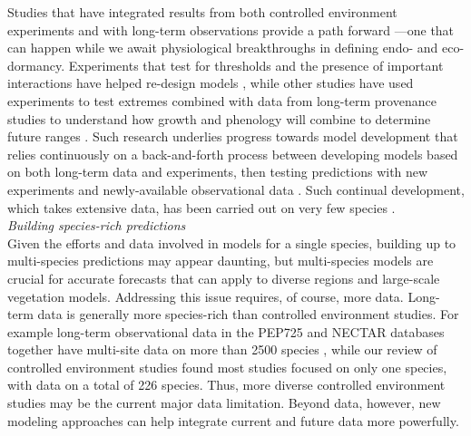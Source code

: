 \documentclass[11pt,letter]{article}
\begin{document}
Studies that have integrated results from both controlled environment experiments and with long-term observations provide a path forward \citep{Caffarra:2011qf,nagano2012,satake2013,ford2016,chuinearees}---one that can happen while we await physiological breakthroughs in defining endo- and eco-dormancy. Experiments that test for thresholds and the presence of important interactions have helped re-design models \citep{Caffarra:2011qf,chuinearees}, while other studies have used experiments to test extremes combined with data from long-term provenance studies to understand how growth and phenology will combine to determine future ranges \citep{ford2016}. Such research underlies progress towards model development that relies continuously on a back-and-forth process between developing models based on both long-term data and experiments, then testing predictions with new experiments and newly-available observational data \citep[i.e., more years and also data from new locations,][]{nagano2012,satake2013}. Such continual development, which takes extensive data, has been carried out on very few species \citep[e.g., \emph{Arabidopsis thaliana}, \emph{Oryza sativa} (rice), \emph{Arabidopsis halleri},][]{Wilczek:2009oa,nagano2012,satake2013}.\\

\emph{Building species-rich predictions}\\
Given the efforts and data involved in models for a single species, building up to multi-species predictions may appear daunting, but multi-species models are crucial for accurate forecasts that can apply to diverse regions and large-scale vegetation models. Addressing this issue requires, of course, more data. Long-term data is generally more species-rich than controlled environment studies. For example long-term observational data in the PEP725 and NECTAR databases together have multi-site data on more than 2500 species \citep{nectar,Templ2018}, while our review of controlled environment studies found most studies focused on only one species, with data on a total of 226 species. Thus, more diverse controlled environment studies may be the current major data limitation. Beyond data, however, new modeling approaches can help integrate current and future data more powerfully. \\
\end{document}
